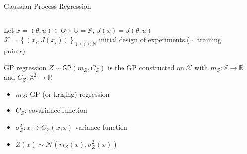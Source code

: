 \documentclass[10pt,aspectratio=169,usepdftitle=false]{beamer}
\newcommand\manupath{/home/victor/acadwriting/Manuscrit/Text/}
\newcommand{\Uspace}{\mathbb{U}}
\newcommand{\Kspace}{\Theta}
\newcommand{\Xspace}{\mathbb{X}}
\newcommand{\GP}{\mathsf{GP}}
\newcommand{\kk}{\theta}
\newcommand{\uu}{u}
\newcommand{\inputpgf}[2][\textwidth]{
  \renewcommand\rmfamily{\sffamily}
  \resizebox{#1}{!}{}}
\begin{document}
\begin{frame}{Gaussian Process Regression}
  \begin{columns}
    \begin{column}{0.5\textwidth}   
  Let $x = (\kk, \uu) \in \Kspace \times \Uspace = \Xspace$, $J(x)= J(\kk, \uu)$
  $\mathcal{X} = \left\{ (x_i, J(x_i)) \right\}_{1 \leq i \leq N}$ initial design of experiments ($\sim$ training points)
  \begin{block}{GP regression \citep{matheron_traite_1962,krige_statistical_1951}}
    $Z \sim \GP\left(m_Z,C_Z\right)$ is the GP constructed on $\mathcal{X}$
    with $m_Z: \Xspace \rightarrow \mathbb{R}$ and $C_Z: \Xspace^2 \rightarrow \mathbb{R}$
    \begin{itemize}
    \item $m_Z$: GP (or kriging) regression
    \item $C_Z$: covariance function
    \item  $\sigma_Z^2: x \mapsto C_Z(x, x)$ variance function
    \item \alert<2>{$Z(x)\sim \mathcal{N}\left(m_Z(x), \sigma^2_Z(x)\right)$}
    \end{itemize}
  \end{block}
  \end{column}
    \begin{column}{0.5\textwidth}
    \begin{center}
      \inputpgf{\manupath Chapter4/img/example_GP_J.pgf}
  \end{center}
\end{column}
\end{columns}
\end{frame}
\end{document}
